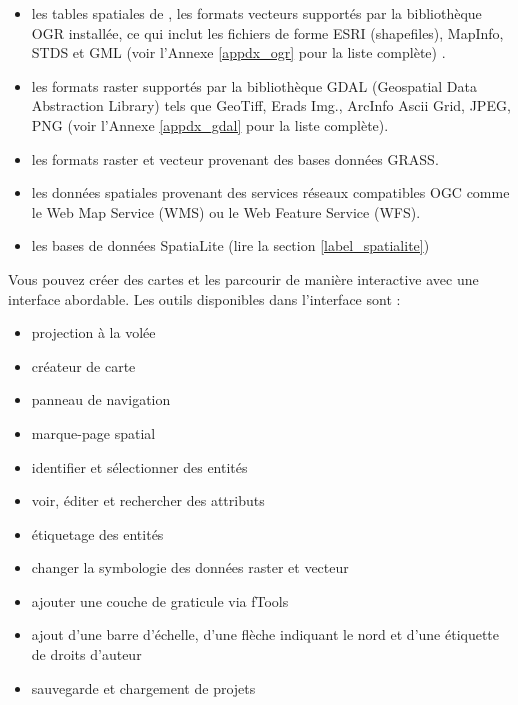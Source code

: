 \begin{itemize}[label=--]
\item les tables spatiales de \ppg, les formats vecteurs supportés par la bibliothèque OGR installée, ce qui inclut les fichiers de forme ESRI (shapefiles), MapInfo, STDS et GML (voir l'Annexe \ref{appdx_ogr} pour la liste complète) .
\item les formats raster supportés par la bibliothèque GDAL (Geospatial Data Abstraction Library) tels que GeoTiff, Erads Img., ArcInfo Ascii Grid, JPEG, PNG (voir l'Annexe \ref{appdx_gdal} pour la liste complète).

\item les formats raster et vecteur provenant des bases données GRASS. 
\item les données spatiales provenant des services réseaux compatibles OGC comme le Web Map Service (WMS) ou le Web Feature Service (WFS).

\item les bases de données SpatiaLite (lire la section \ref{label_spatialite}) 
\end{itemize}

Vous pouvez créer des cartes et les parcourir de manière interactive avec une interface abordable. Les outils disponibles dans l'interface sont :

\begin{itemize}[label=--]
\item projection à la volée
\item créateur de carte
\item panneau de navigation
\item marque-page spatial
\item identifier et sélectionner des entités
\item voir, éditer et rechercher des attributs
\item étiquetage des entités
\item changer la symbologie des données raster et vecteur
\item ajouter une couche de graticule via fTools
\item ajout d'une barre d'échelle, d'une flèche indiquant le nord et d'une étiquette de droits d'auteur
\item sauvegarde et chargement de projets
\end{itemize}


